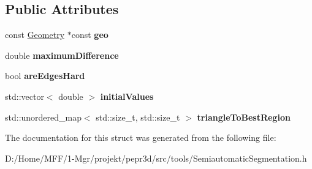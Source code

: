 \subsection*{Public Attributes}
\begin{DoxyCompactItemize}
\item 
\mbox{\label{structpepr3d_1_1_semiautomatic_segmentation_1_1_s_d_f_stopping_add1b1df963eb281249066ffc8caf28e3}} 
const \mbox{\hyperlink{classpepr3d_1_1_geometry}{Geometry}} $\ast$const {\bfseries geo}
\item 
\mbox{\label{structpepr3d_1_1_semiautomatic_segmentation_1_1_s_d_f_stopping_ab88bf8a7dcafc3c408beccba9507fa9f}} 
double {\bfseries maximum\+Difference}
\item 
\mbox{\label{structpepr3d_1_1_semiautomatic_segmentation_1_1_s_d_f_stopping_a02a7dfbd90f1326160f68f7b0feb3812}} 
bool {\bfseries are\+Edges\+Hard}
\item 
\mbox{\label{structpepr3d_1_1_semiautomatic_segmentation_1_1_s_d_f_stopping_a9b31c3ff6551cd006b1c3960e1404e8b}} 
std\+::vector$<$ double $>$ {\bfseries initial\+Values}
\item 
\mbox{\label{structpepr3d_1_1_semiautomatic_segmentation_1_1_s_d_f_stopping_a609511530c45cd2adb70a6bc9c310c7d}} 
std\+::unordered\+\_\+map$<$ std\+::size\+\_\+t, std\+::size\+\_\+t $>$ {\bfseries triangle\+To\+Best\+Region}
\end{DoxyCompactItemize}


The documentation for this struct was generated from the following file\+:\begin{DoxyCompactItemize}
\item 
D\+:/\+Home/\+M\+F\+F/1-\/\+Mgr/projekt/pepr3d/src/tools/Semiautomatic\+Segmentation.\+h\end{DoxyCompactItemize}
